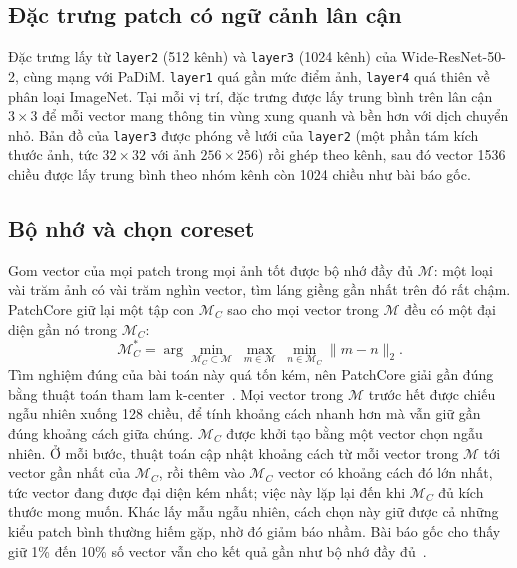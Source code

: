 \subsection{Đặc trưng patch có ngữ cảnh lân cận}

Đặc trưng lấy từ \texttt{layer2} (512 kênh) và \texttt{layer3} (1024 kênh) của Wide-ResNet-50-2, cùng mạng với
PaDiM. \texttt{layer1} quá gần mức điểm ảnh, \texttt{layer4} quá thiên về phân loại ImageNet. Tại mỗi vị trí, đặc
trưng được lấy trung bình trên lân cận $3\times3$ để mỗi vector mang thông tin vùng xung quanh và bền hơn với dịch
chuyển nhỏ. Bản đồ của \texttt{layer3} được phóng về lưới của \texttt{layer2} (một phần tám kích thước ảnh, tức
$32\times32$ với ảnh $256\times256$) rồi ghép theo kênh, sau đó vector 1536 chiều được lấy trung bình theo nhóm kênh
còn 1024 chiều như bài báo gốc.

\subsection{Bộ nhớ và chọn coreset}

Gom vector của mọi patch trong mọi ảnh tốt được bộ nhớ đầy đủ $\mathcal{M}$: một loại vài trăm ảnh có vài trăm
nghìn vector, tìm láng giềng gần nhất trên đó rất chậm. PatchCore giữ lại một tập con $\mathcal{M}_C$ sao cho mọi
vector trong $\mathcal{M}$ đều có một đại diện gần nó trong $\mathcal{M}_C$:
\begin{equation}
  \mathcal{M}_C^{*} = \arg\min_{\mathcal{M}_C \subset \mathcal{M}} \; \max_{m \in \mathcal{M}} \; \min_{n \in \mathcal{M}_C} \lVert m - n\rVert_2 .
  \label{eq:coreset}
\end{equation}
Tìm nghiệm đúng của bài toán này quá tốn kém, nên PatchCore giải gần đúng bằng thuật toán tham lam
k-center~\cite{senerActiveLearningConvolutional2018}. Mọi vector trong $\mathcal{M}$ trước hết được chiếu ngẫu
nhiên xuống 128 chiều, để tính khoảng cách nhanh hơn mà vẫn giữ gần đúng khoảng cách giữa chúng. $\mathcal{M}_C$
được khởi tạo bằng một vector chọn ngẫu nhiên. Ở mỗi bước, thuật toán cập nhật khoảng cách từ mỗi vector trong
$\mathcal{M}$ tới vector gần nhất của $\mathcal{M}_C$, rồi thêm vào $\mathcal{M}_C$ vector có khoảng cách đó lớn
nhất, tức vector đang được đại diện kém nhất; việc này lặp lại đến khi $\mathcal{M}_C$ đủ kích thước mong muốn.
Khác lấy mẫu ngẫu nhiên, cách chọn này giữ được cả những kiểu patch bình thường hiếm gặp, nhờ đó giảm báo nhầm.
Bài báo gốc cho thấy giữ 1\% đến 10\% số vector vẫn cho kết quả gần như bộ nhớ đầy
đủ~\cite{rothTotalRecallIndustrial2022}.

